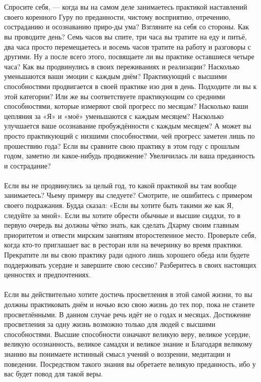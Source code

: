 \\ \\ Спросите себя, — когда вы на самом деле занимаетесь практикой наставлений своего коренного Гуру по преданности, чисто\-му восприятию, отречению, состраданию и осознаванию приро-ды ума? Взгляните на себя со стороны. Как вы проводите день? Семь часов вы спите, три часа вы тратите на еду и питьё, два часа просто перемещаетесь и восемь часов тратите на работу и разговоры с другими. Ну а после всего этого, посвящаете ли вы практике оставшиеся четыре часа? Как вы продвинулись в своих переживаниях и реализации? Насколько уменьшаются ваши эмоции с каждым днём? Практикующий с высшими способностями продвигается в своей практике изо дня в день. Подходите ли вы к этой категории? Или же вы соответствуете практикующим со средними способностями, которые измеряют свой прогресс по месяцам? Насколько ваши цепляния за «Я» и «моё» уменьшаются с каждым месяцем? Насколько улучшается ваше осознавание пробуждённости с каждым месяцем? А может вы просто практикующий с низшими способностями, чей прогресс заметен лишь по прошествию года? Если вы сравните свою практику в этом году с прошлым годом, заметно ли какое-нибудь продвижение? Увеличилась ли ваша преданность и сострадание?
\\ \\ Если вы не продвинулись за целый год, то какой практикой вы там вообще занимаетесь? Чьему примеру вы следуете? Смотрите, не ошибитесь с примером своего подражания. Будда сказал: «Если вы хотите быть такими же как Я, следуйте за мной». Если вы хотите обрести обычные и высшие сиддхи, то в первую очередь вы должны чётко знать, как сделать Дхарму своим главным приоритетом и отвести мирским занятиям второстепенное место. Проверьте себя, когда кто-то приглаша\-ет вас в ресторан или на вечеринку во время практики. Прекратите ли вы свою практику ради одного лишь хорошего обеда или будете поддерживать усердие и завершите свою сессию? Разберитесь в своих настоящих ценностях и предпочтениях.
\\ \\ Если вы действительно хотите достичь просветления в этой самой жизни, то вы должны практиковать днём и ночью всю свою жизнь до тех пор, пока не станете просветлёнными. В данном случае речь идёт не о годах и месяцах. Достижение просветления за одну жизнь возможно только для людей с высшими способностями. Высшие способности означают великую веру, великое усердие, великую осознанность, великое самадхи и великое знание и Благодаря великому знанию вы понимаете истинный смысл учений о воззрении, медитации и поведении. Посредством такого знания вы обретаете великую преданность, ибо у вас будет повод для такой веры.
